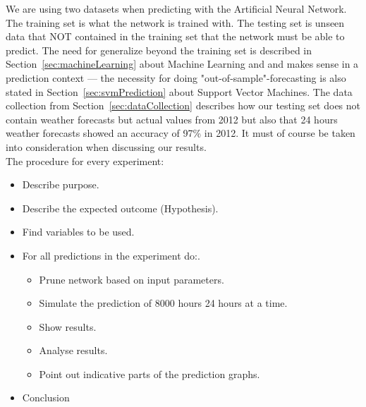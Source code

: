 We are using two datasets when predicting with the Artificial Neural Network. The training set is what the network is trained with. The testing set is unseen data that NOT contained in the training set that the network must be able to predict. The need for generalize beyond the training set is described in Section~\ref{sec:machineLearning} about Machine Learning and and makes sense in a prediction context --- the necessity for doing "out-of-sample"-forecasting is also stated in Section~\ref{sec:svmPrediction} about Support Vector Machines. The data collection from Section~\ref{sec:dataCollection} describes how our testing set does not contain weather forecasts but actual values from 2012 but also that 24 hours weather forecasts showed an accuracy of 97\% in 2012. It must of course be taken into consideration when discussing our results.
\\[0.5cm]
The procedure for every experiment:
\begin{itemize}
\item Describe purpose.
\item Describe the expected outcome (Hypothesis).
\item Find variables to be used.
\item For all predictions in the experiment do:.
\begin{itemize}
	\item Prune network based on input parameters.
	\item Simulate the prediction of 8000 hours 24 hours at a time.
	\item Show results.
	\item Analyse results.
	\item Point out indicative parts of the prediction graphs.
\end{itemize}
\item Conclusion

\end{itemize}